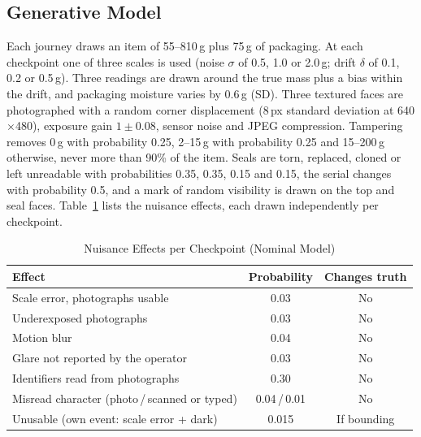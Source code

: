 \documentclass[conference]{IEEEtran}
\begin{document}
\subsection{Generative Model}
Each journey draws an item of 55--810\,g plus 75\,g of packaging. At each checkpoint one of three scales is used (noise $\sigma$ of 0.5, 1.0 or 2.0\,g; drift $\delta$ of 0.1, 0.2 or 0.5\,g). Three readings are drawn around the true mass plus a bias within the drift, and packaging moisture varies by 0.6\,g (SD). Three textured faces are photographed with a random corner displacement (8\,px standard deviation at 640$\times$480), exposure gain $1\pm0.08$, sensor noise and JPEG compression. Tampering removes 0\,g with probability 0.25, 2--15\,g with probability 0.25 and 15--200\,g otherwise, never more than 90\% of the item. Seals are torn, replaced, cloned or left unreadable with probabilities 0.35, 0.35, 0.15 and 0.15, the serial changes with probability 0.5, and a mark of random visibility is drawn on the top and seal faces. Table~\ref{tab:nuisance} lists the nuisance effects, each drawn independently per checkpoint.

\begin{table}[t]
\caption{Nuisance Effects per Checkpoint (Nominal Model)}
\label{tab:nuisance}
\centering
\footnotesize
\begin{tabular}{@{}lcc@{}}
\toprule
Effect & Probability & Changes truth \\
\midrule
Scale error, photographs usable & 0.03 & No \\
Underexposed photographs & 0.03 & No \\
Motion blur & 0.04 & No \\
Glare not reported by the operator & 0.03 & No \\
Identifiers read from photographs & 0.30 & No \\
Misread character (photo\,/\,scanned or typed) & 0.04\,/\,0.01 & No \\
Unusable (own event: scale error + dark) & 0.015 & If bounding \\
\bottomrule
\end{tabular}
\end{table}
\end{document}
